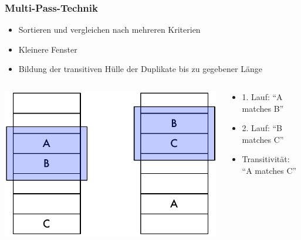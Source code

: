     
    \begin{frame}
    \frametitle{Multi-Pass-Technik}
    
    \begin{itemize}
    \item Sortieren und vergleichen nach mehreren Kriterien
    \item Kleinere Fenster
    \item Bildung der transitiven Hülle der Duplikate bis zu gegebener Länge
    \end{itemize}
    
    \begin{columns}[c]
    \begin{column}{6cm}
    \includegraphics[scale=.6]{fig4/multi-pass.pdf}
    \end{column}
    \begin{column}{5cm}
    \begin{itemize}
    \item 1. Lauf: "`A matches B"'
    \item 2. Lauf: "`B matches C"'
    \item Transitivität: "`A matches C"'
    \end{itemize}
    \end{column}
    \end{columns}
    
    \end{frame}
    
    
